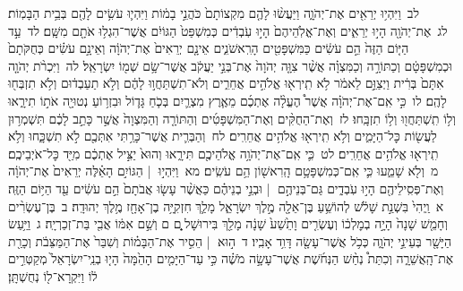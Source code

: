 \documentclass[18pt]{article}
\begin{document}
 {\loc לב~}וַיִּהְי֥וּ יְרֵאִ֖ים אֶת־יְהֹוָ֑ה וַיַּעֲשׂ֨וּ לָהֶ֤ם מִקְצוֹתָם֙ כֹּהֲנֵ֣י בָמ֔וֹת וַיִּהְי֛וּ עֹשִׂ֥ים לָהֶ֖ם בְּבֵ֥ית הַבָּמֽוֹת׃ \startlock
 {\loc לג~}אֶת־יְהֹוָ֖ה הָי֣וּ יְרֵאִ֑ים וְאֶת־אֱלֹֽהֵיהֶם֙ הָי֣וּ עֹֽבְדִ֔ים כְּמִשְׁפַּט֙ הַגּוֹיִ֔ם אֲשֶׁר־הִגְל֥וּ אֹתָ֖ם מִשָּֽׁם׃ \startlock
 {\loc לד~}עַ֣ד הַיּ֤וֹם הַזֶּה֙ הֵ֣ם עֹשִׂ֔ים כַּמִּשְׁפָּטִ֖ים הָרִֽאשֹׁנִ֑ים אֵינָ֤ם יְרֵאִים֙ אֶת־יְהֹוָ֔ה וְאֵינָ֣ם עֹשִׂ֗ים כְּחֻקֹּתָם֙ וּכְמִשְׁפָּטָ֔ם וְכַתּוֹרָ֣ה וְכַמִּצְוָ֗ה אֲשֶׁ֨ר צִוָּ֤ה יְהֹוָה֙ אֶת־בְּנֵ֣י יַעֲקֹ֔ב אֲשֶׁר־שָׂ֥ם שְׁמ֖וֹ יִשְׂרָאֵֽל׃ \startlock
 {\loc לה~}וַיִּכְרֹ֨ת יְהֹוָ֤ה אִתָּם֙ בְּרִ֔ית וַיְצַוֵּ֣ם לֵאמֹ֔ר לֹ֥א תִֽירְא֖וּ אֱלֹהִ֣ים אֲחֵרִ֑ים וְלֹא־תִשְׁתַּחֲו֣וּ לָהֶ֔ם וְלֹ֣א תַעַבְד֔וּם וְלֹ֥א תִזְבְּח֖וּ לָהֶֽם׃ \startlock
 {\loc לו~}כִּ֣י אִֽם־אֶת־יְהֹוָ֗ה אֲשֶׁר֩ הֶעֱלָ֨ה אֶתְכֶ֜ם מֵאֶ֧רֶץ מִצְרַ֛יִם בְּכֹ֧חַ גָּד֛וֹל וּבִזְר֥וֹעַ נְטוּיָ֖ה אֹת֣וֹ תִירָ֑אוּ וְל֥וֹ תִֽשְׁתַּחֲו֖וּ וְל֥וֹ תִזְבָּֽחוּ׃ \startlock
 {\loc לז~}וְאֶת־הַחֻקִּ֨ים וְאֶת־הַמִּשְׁפָּטִ֜ים וְהַתּוֹרָ֤ה וְהַמִּצְוָה֙ אֲשֶׁ֣ר כָּתַ֣ב לָכֶ֔ם תִּשְׁמְר֥וּן לַעֲשׂ֖וֹת כׇּל־הַיָּמִ֑ים וְלֹ֥א תִֽירְא֖וּ אֱלֹהִ֥ים אֲחֵרִֽים׃ \startlock
 {\loc לח~}וְהַבְּרִ֛ית אֲשֶׁר־כָּרַ֥תִּי אִתְּכֶ֖ם לֹ֣א תִשְׁכָּ֑חוּ וְלֹ֥א תִֽירְא֖וּ אֱלֹהִ֥ים אֲחֵרִֽים׃ \startlock
 {\loc לט~}כִּ֛י אִֽם־אֶת־יְהֹוָ֥ה אֱלֹהֵיכֶ֖ם תִּירָ֑אוּ וְהוּא֙ יַצִּ֣יל אֶתְכֶ֔ם מִיַּ֖ד כׇּל־אֹיְבֵיכֶֽם׃ \startlock
 {\loc מ~}וְלֹ֖א שָׁמֵ֑עוּ כִּ֛י אִֽם־כְּמִשְׁפָּטָ֥ם הָֽרִאשׁ֖וֹן הֵ֥ם עֹשִֽׂים׃ \startlock
 {\loc מא~}וַיִּהְי֣וּ  |  הַגּוֹיִ֣ם הָאֵ֗לֶּה יְרֵאִים֙ אֶת־יְהֹוָ֔ה וְאֶת־פְּסִֽילֵיהֶ֖ם הָי֣וּ עֹֽבְדִ֑ים גַּם־בְּנֵיהֶ֣ם  |  וּבְנֵ֣י בְנֵיהֶ֗ם כַּאֲשֶׁ֨ר עָשׂ֤וּ אֲבֹתָם֙ הֵ֣ם עֹשִׂ֔ים עַ֖ד הַיּ֥וֹם הַזֶּֽה׃ 
\startlock
 {\loc א~}וַֽיְהִי֙ בִּשְׁנַ֣ת שָׁלֹ֔שׁ לְהוֹשֵׁ֥עַ בֶּן־אֵלָ֖ה מֶ֣לֶךְ יִשְׂרָאֵ֑ל מָלַ֛ךְ חִזְקִיָּ֥ה בֶן־אָחָ֖ז מֶ֥לֶךְ יְהוּדָֽה׃ \startlock
 {\loc ב~}בֶּן־עֶשְׂרִ֨ים וְחָמֵ֤שׁ שָׁנָה֙ הָיָ֣ה בְמׇלְכ֔וֹ וְעֶשְׂרִ֤ים וָתֵ֙שַׁע֙ שָׁנָ֔ה מָלַ֖ךְ בִּירוּשָׁל ָ֑͏ְם ם וְשֵׁ֣ם אִמּ֔וֹ אֲבִ֖י בַּת־זְכַרְיָֽה׃ \startlock
 {\loc ג~}וַיַּ֥עַשׂ הַיָּשָׁ֖ר בְּעֵינֵ֣י יְהֹוָ֑ה כְּכֹ֥ל אֲשֶׁר־עָשָׂ֖ה דָּוִ֥ד אָבִֽיו׃ \startlock
 {\loc ד~}ה֣וּא  |  הֵסִ֣יר אֶת־הַבָּמ֗וֹת וְשִׁבַּר֙ אֶת־הַמַּצֵּבֹ֔ת וְכָרַ֖ת אֶת־הָֽאֲשֵׁרָ֑ה וְכִתַּת֩ נְחַ֨שׁ הַנְּחֹ֜שֶׁת אֲשֶׁר־עָשָׂ֣ה מֹשֶׁ֗ה כִּ֣י עַד־הַיָּמִ֤ים הָהֵ֙מָּה֙ הָי֤וּ בְנֵֽי־יִשְׂרָאֵל֙ מְקַטְּרִ֣ים ל֔וֹ וַיִּקְרָא־ל֖וֹ נְחֻשְׁתָּֽן׃ \startlock
\end{document}
